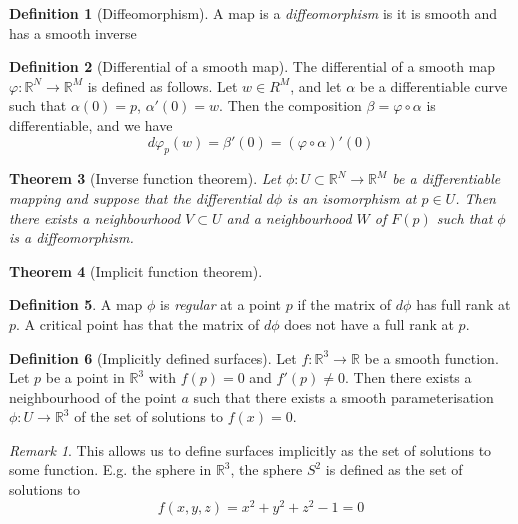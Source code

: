 \documentclass[10pt, oneside, reqno]{amsart}
\newcommand{\R}{\mathbb{R}}
\theoremstyle{plain}%
\newtheorem{thm}{Theorem}[section]
\theoremstyle{definition}
\newtheorem{defn}[thm]{Definition}
\theoremstyle{remark}
\newtheorem*{rem}{Remark}
\begin{document}
\begin{defn}[Diffeomorphism] 
    A map is a \emph{diffeomorphism} is it is smooth and has a smooth inverse
\end{defn}

\begin{defn}[Differential of a smooth map]
    The differential of a smooth map $\varphi: \R^N \rightarrow \R^M$ is defined as follows.  Let $w \in R^M$, and let $\alpha$ be a differentiable curve such that $\alpha(0) = p$, $\alpha'(0) = w$.  Then the composition $\beta = \varphi \circ \alpha$ is differentiable, and we have \[
        d \varphi_p (w) = \beta'(0) = (\varphi \circ \alpha)'(0)
    \]
    
\end{defn}

\begin{thm}[Inverse function theorem]
    Let  $\phi : U \subset \R^N \rightarrow \R^M$ be a differentiable mapping and suppose that the differential $d \phi$ is an isomorphism at $p \in U$.  Then there exists a neighbourhood $V \subset U$ and a neighbourhood $W$ of $F(p)$ such that $\phi$ is a diffeomorphism. 
\end{thm}

\begin{thm}[Implicit function theorem]
    
\end{thm}

\begin{defn}
    A map $\phi$ is \emph{regular} at a point $p$ if the matrix of $d\phi$ has full rank at $p$.  A critical point has that the matrix of $d\phi$ does not have a full rank at $p$.
\end{defn}

\begin{defn}[Implicitly defined surfaces]
    Let $f: \R^3 \rightarrow \R$ be a smooth function.  Let $p$ be a point in $\R^3$ with $f(p) =0$ and $f'(p) \neq 0$.  Then there exists a neighbourhood of the point $a$ such that there exists a smooth parameterisation $\phi : U \rightarrow \R^3$ of the set of solutions to $f(x) = 0$.
\end{defn}

\begin{rem}
    This allows us to define surfaces implicitly as the set of solutions to some function.  E.g. the sphere in $\R^3$, the sphere $S^2$ is defined as the set of solutions to \[
        f(x,y,z) = x^2 +y^2 + z^2 - 1 = 0
    \]
\end{rem}
\end{document}

